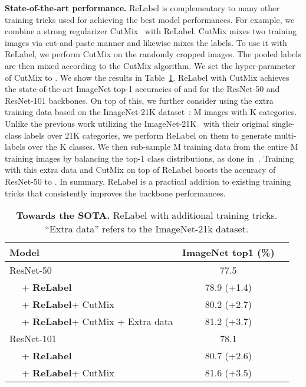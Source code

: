 \documentclass[final]{cvpr}
\newcommand\ours{{{\mbox{ReLabel}}}\xspace}
\newcommand\oursb{{\textbf{\mbox{ReLabel}}}\xspace}
\begin{document}
\noindent\textbf{State-of-the-art performance.}
\ours is complementary to many other training tricks used for achieving the best model performances. For example, we combine a strong regularizer CutMix~\cite{yun2019cutmix} with \ours. CutMix mixes two training images via cut-and-paste manner and likewise mixes the labels. To use it with \ours, we perform CutMix on the randomly cropped images. The pooled labels are then mixed according to the CutMix algorithm. We set the hyper-parameter of CutMix  to .
We show the results in Table~\ref{tab:towards-sota}.
\ours with CutMix achieves the state-of-the-art ImageNet top-1 accuracies of  and  for the ResNet-50 and ResNet-101 backbones. 
On top of this, we further consider using the extra training data based on the ImageNet-21K dataset~\cite{deng2009imagenet}: M images with K categories.
Unlike the previous work utilizing the ImageNet-21K~\cite{kolesnikov2019big} with their original single-class labels over 21K categories, we perform \ours on them to generate multi-labels over the K classes.
We then sub-sample M training data from the entire M training images by balancing the top-1 class distributions, as done in~\cite{yalniz2019billion}.
Training with this extra data and CutMix on top of \ours boosts the accuracy of ResNet-50 to .
In summary, \ours is a practical addition to existing training tricks that consistently improves the backbone performances.

\begin{table}
\vspace{-0.2cm}
\centering
\tabcolsep=0.12cm
\begin{tabular}{@{}lcc@{}}
\toprule
Model       & ImageNet top1 (\%) & \\ \midrule
ResNet-50 & 77.5  & \\
~~ + \oursb & 78.9 (+1.4) & \\
~~ + \oursb + CutMix & 80.2 (+2.7)& \\
~~ + \oursb + CutMix + Extra data & 81.2 (+3.7) & \\ \midrule
ResNet-101 & 78.1  & \\
~~ + \oursb & 80.7 (+2.6) & \\
~~ + \oursb + CutMix & 81.6 (+3.5) & \\
\bottomrule
\end{tabular}
\caption{\textbf{Towards the SOTA.} \ours with additional training tricks. ``Extra data'' refers to the ImageNet-21k dataset.}
\label{tab:towards-sota}
\vspace{-0.2cm}
\end{table} 
\end{document}
